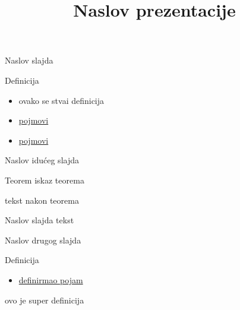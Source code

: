 \documentclass[aspectratio=43, hyperref={pdftex, hyperfootnotes=false}]{beamer}
\title{Naslov prezentacije}
\begin{document}
\nocite{ionin2006combinatorics, janko1985construction, douglas2004combinatorial}

\begin{frame}
    \titlepage
\end{frame}


\begin{frame}[t]{Naslov slajda}
    \begin{block}{Definicija}
        \begin{itemize}
            \item ovako se stvai definicija
            \item \underline{pojmovi}
            \item \underline{pojmovi}
        \end{itemize}
    \end{block}
\end{frame}

\begin{frame}[t]{Naslov idu\' ceg slajda}
    \begin{block}{Teorem}
        iskaz teorema
    \end{block}
    
    tekst nakon teorema
\end{frame}

\begin{frame}[t]{Naslov slajda}
    tekst
\end{frame}

\begin{frame}[t]{Naslov drugog slajda}
    \begin{block}{Definicija}
        \begin{itemize}
            \item \underline{definirmao pojam}
        \end{itemize}
    \end{block}
    
    ovo je super definicija
\end{frame}
\end{document}

